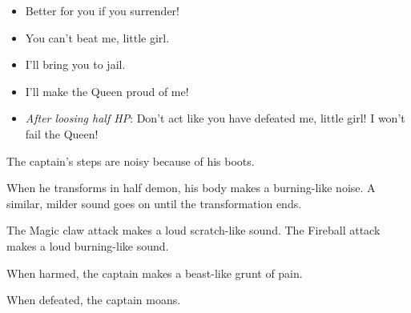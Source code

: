 \begin{itemize}
	\item Better for you if you surrender!
	\item You can't beat me, little girl.
	\item I'll bring you to jail.
	\item I'll make the Queen proud of me!
	\item \textit{After loosing half HP}: Don't act like you have defeated me, little girl! I won't fail the Queen!
\end{itemize}

The captain's steps are noisy because of his boots.

When he transforms in half demon, his body makes a burning-like noise. A similar, milder sound goes on until the transformation ends.

The Magic claw attack makes a loud scratch-like sound. The Fireball attack makes a loud burning-like sound.

When harmed, the captain makes a beast-like grunt of pain.

When defeated, the captain moans.
